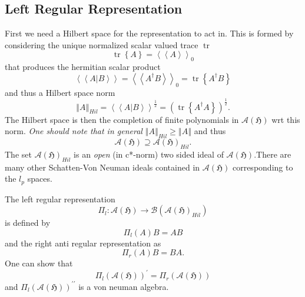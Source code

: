 \documentclass[aps,preprint]{revtex4}%
\begin{document}
\subsection{Left Regular Representation}

First we need a Hilbert space for the representation to act in. This is formed
by considering the unique normalized scalar valued trace $\operatorname*{tr}$
\begin{equation}
\operatorname*{tr}\left\{  A\right\}  =\left\langle \left\langle
A\right\rangle \right\rangle _{0}%
\end{equation}
that produces the hermitian scalar product
\begin{equation}
\left\langle \left\langle A\left\vert B\right.  \right\rangle \right\rangle
=\left\langle \left\langle A^{\dagger}B\right\rangle \right\rangle
_{0}=\operatorname*{tr}\left\{  A^{\dagger}B\right\}
\end{equation}
and thus a Hilbert space norm
\begin{equation}
\left\Vert A\right\Vert _{Hil}=\left\langle \left\langle A\left\vert B\right.
\right\rangle \right\rangle ^{\frac{1}{2}}=\left(  \operatorname*{tr}\left\{
A^{\dagger}A\right\}  \right)  ^{\frac{1}{2}}.
\end{equation}
The Hilbert space is then the completion of finite polynomials in
$\mathcal{A}\left(  \mathfrak{H}\right)  $ wrt this norm. \emph{One should
note that in general }$\left\Vert A\right\Vert _{Hil}\geq\left\Vert
A\right\Vert $ and thus
\begin{equation}
\mathcal{A}\left(  \mathfrak{H}\right)  \supseteq\mathcal{A}\left(
\mathfrak{H}\right)  _{Hil}.
\end{equation}
The set $\mathcal{A}\left(  \mathfrak{H}\right)  _{Hil}$ is an \emph{open} (in
c*-norm) two sided ideal of $\mathcal{A}\left(  \mathfrak{H}\right)  .$There
are many other Schatten-Von Neuman ideals contained in $\mathcal{A}\left(
\mathfrak{H}\right)  $ corresponding to the $l_{p}$ spaces.

The left regular representation
\begin{equation}
\Pi_{l}:\mathcal{A}\left(  \mathfrak{H}\right)  \rightarrow\mathcal{B}\left(
\mathcal{A}\left(  \mathfrak{H}\right)  _{Hil}\right)
\end{equation}
is defined by
\begin{equation}
\Pi_{l}\left(  A\right)  B=AB
\end{equation}
and the right anti regular representation as
\begin{equation}
\Pi_{r}\left(  A\right)  B=BA.
\end{equation}
One can show that%
\begin{equation}
\Pi_{l}\left(  \mathcal{A}\left(  \mathfrak{H}\right)  \right)  ^{\prime}%
=\Pi_{r}\left(  \mathcal{A}\left(  \mathfrak{H}\right)  \right)
\end{equation}
and $\Pi_{l}\left(  \mathcal{A}\left(  \mathfrak{H}\right)  \right)
^{\prime\prime}$ is a von neuman algebra.
\end{document}
